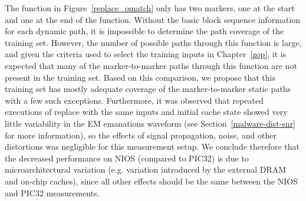 The function in Figure~\ref{replace_omatch} only has two markers, one at the start and one at the end of the function. Without the basic block sequence information for each dynamic path, it is impossible to determine the path coverage of the training set. However, the number of possible paths through this function is large, and given the criteria used to select the training inputs in Chapter~\ref{zop}, it is expected that many of the marker-to-marker paths through this function are not present in the training set. Based on this comparison, we propose that this training set has mostly adequate coverage of the marker-to-marker static paths with a few such exceptions. Furthermore, it was observed that repeated executions of replace with the same inputs and initial cache state showed very little variability in the EM emanations waveform (see Section~\ref{malware-dist-snr} for more information), so the effects of signal propagation, noise, and other distortions was negligible for this measurement setup. We conclude therefore that the decreased performance on NIOS (compared to PIC32) is due to microarchitectural variation (e.g. variation introduced by the external DRAM and on-chip caches), since all other effects should be the same between the NIOS and PIC32 measurements.



